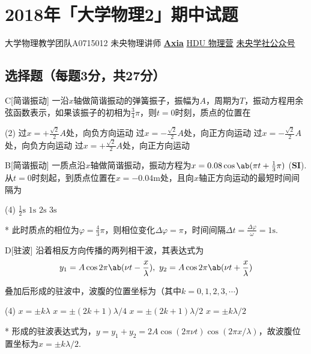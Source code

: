 \chapter{2018年「大学物理2」期中试题}
\date{2018年11月11日}{大学物理教学团队}{A0715012}
{未央物理讲师 \href{https://qm.qq.com/q/UPbGudx8cK}{\textbf{Axia}}}
{}{\href{https://h5.qun.qq.com/s/WRps3LNC8K}{HDU 物理营}}
{}{\href{http://weixin.qq.com/r/mhKYgFTEMQlOrRDj90eI}{未央学社公众号}}

\section{选择题（每题3分，共27分）}
\begin{choice}{C}[简谐振动]
    一沿$x$轴做简谐振动的弹簧振子，振幅为$A$，周期为$T$，振动方程用余弦函数表示，如果该振子的初相为$\frac{3}{4}\pi$，则$t=0$时刻，质点的位置在
    \begin{tasks}(2)
        \task 过$x=+\frac{\sqrt{2}}{2}A$处，向负方向运动
        \task 过$x=-\frac{\sqrt{2}}{2}A$处，向正方向运动
        \task 过$x=-\frac{\sqrt{2}}{2}A$处，向负方向运动
        \task 过$x=+\frac{\sqrt{2}}{2}A$处，向正方向运动
    \end{tasks}
\end{choice}

\begin{choice}{B}[简谐振动]
    一质点沿$x$轴做简谐振动，振动方程为$x=0.08\cos{\ab(\pi t+\frac{1}{3}\pi)}$ (\textbf{SI}).从$t=0$时刻起，到质点位置在$x=-0.04\mathrm{m}$处，且向$x$轴正方向运动的最短时间间隔为
    \begin{tasks}(4)
        \task $\frac{1}{2}\mathrm{s}$
        \task $1\mathrm{s}$
        \task $2\mathrm{s}$
        \task $3\mathrm{s}$
    \end{tasks}
\end{choice}
\begin{solution}*
    此时质点的相位为$\varphi=\frac{4}{3}\pi$，则相位变化$\Delta\varphi=\pi$，时间间隔$\Delta t=\frac{\Delta\varphi}{\omega}=1\mathrm{s}$.
\end{solution}

\begin{choice}{D}[驻波]
    沿着相反方向传播的两列相干波，其表达式为
    \[y_1=A\cos{2\pi\ab(\nu t-\frac{x}{\lambda})},\ y_2=A\cos{2\pi\ab(\nu t+\frac{x}{\lambda})}\]

    叠加后形成的驻波中，波腹的位置坐标为（其中$k=0,1,2,3,\cdots$）
    \begin{tasks}(4)
        \task $x=\pm k\lambda$
        \task $x=\pm(2k+1)\lambda/4$
        \task $x=\pm(2k+1)\lambda/2$
        \task $x=\pm k\lambda/2$
    \end{tasks}
\end{choice}
\begin{solution}*
    形成的驻波表达式为，$y=y_1+y_2=2A\cos(2\pi\nu t)\cos(2\pi x/\lambda)$，故波腹位置坐标为$x=\pm k\lambda/2$.
\end{solution}

